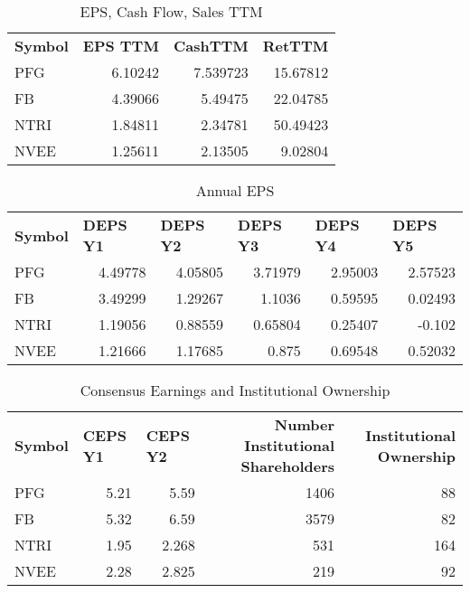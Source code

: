 \documentclass{article}
\begin{document}
\begin{table}[htbp]
  \caption{EPS, Cash Flow, Sales TTM}
   \begin{tabular}{lrrr}
    \textbf{Symbol} & \multicolumn{1}{l}{\textbf{EPS TTM}} & \multicolumn{1}{l}{\textbf{CashTTM}} & \multicolumn{1}{l}{\textbf{RetTTM}} \\
    PFG   & 6.10242 & 7.539723 & 15.67812 \\
    FB    & 4.39066 & 5.49475 & 22.04785 \\
    NTRI  & 1.84811 & 2.34781 & 50.49423 \\
    NVEE  & 1.25611 & 2.13505 & 9.02804 \\
    \end{tabular}%
  \label{tab:addlabel}%
\end{table}%

\begin{table}[htbp]
  \caption{Annual EPS}
      \begin{tabular}{lrrrrr}
    \textbf{Symbol} & \multicolumn{1}{l}{\textbf{DEPS Y1}} & \multicolumn{1}{l}{\textbf{DEPS Y2}} & \multicolumn{1}{l}{\textbf{DEPS Y3}} & \multicolumn{1}{l}{\textbf{DEPS Y4}} & \multicolumn{1}{l}{\textbf{DEPS Y5}} \\
    PFG   & 4.49778 & 4.05805 & 3.71979 & 2.95003 & 2.57523 \\
    FB    & 3.49299 & 1.29267 & 1.1036 & 0.59595 & 0.02493 \\
    NTRI  & 1.19056 & 0.88559 & 0.65804 & 0.25407 & -0.102 \\
    NVEE  & 1.21666 & 1.17685 & 0.875 & 0.69548 & 0.52032 \\
    \end{tabular}%
  \label{tab:addlabel}%
\end{table}%

\begin{table}[htbp]
  \caption{Consensus Earnings and Institutional Ownership}
    \begin{tabular}{lrrrr}
    \textbf{Symbol} & \multicolumn{1}{l}{\textbf{CEPS Y1}} & \multicolumn{1}{l}{\textbf{CEPS Y2}} & \multicolumn{1}{p{4.215em}}{\textbf{Number Institutional Shareholders}} & \multicolumn{1}{p{4.215em}}{\textbf{Institutional Ownership}} \\
    PFG   & 5.21  & 5.59  & 1406  & 88 \\
    FB    & 5.32  & 6.59  & 3579  & 82 \\
    NTRI  & 1.95  & 2.268 & 531   & 164 \\
    NVEE  & 2.28  & 2.825 & 219   & 92 \\
    \end{tabular}%
  \label{tab:addlabel}%
\end{table}%
\end{document}
